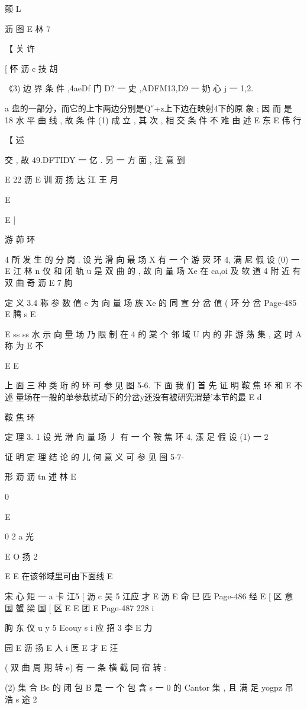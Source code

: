 {{{{颠 L

沥
图
E 林 7

【 关 许

[ 怀 沥 c 技 胡

《3) 边 界 条 件 ,4aeDf 门 D? 一 史 ,ADFM13,D9 一 奶 心 j 一 1,2.

a
盘的一部分，而它的上卞两边分别是Q″+z上下边在映射4下的原
象 ; 因 而 是 18 水 平 曲 线 , 故 条 件 (1) 成 立 , 其 次 , 相 交 条 件 不 难 由 述
E 东 E 伟 行

【 述

交 , 故 49.DFTIDY 一 亿 . 另 一 方 面 , 注 意 到

E 22 沥
E 训 沥 扬 达 江 王 月

E

E |

游 茆 环

4
所 发 生 的 分 岗 . 设 光 滑 向 最 场 X 有 一 个 游 荧 环 4, 满 尼 假 设 (0) 一
E 江 林 n 仪
和 闭 轨 u 是 双 曲 的 , 故 向 量 场 Xe 在 ca,oi 及 软 道 4 附 近 有 双 曲 奇
沥
E 7 朐

定 义 3.4 称 参 数 值 e 为 向 量 场 族 Xe 的 同 宣 分 岔 值 ( 环 分 岔
Page-485
E 腾 s E

E ss ss 水
示 向 量 场 乃 限 制 在 4 的 棠 个 邻 域 U 内 的 非 游 荡 集 , 这 时 A 称 为
E 不

E
E

上 面 三 种 类 珩 的 环 可 参 见 图 5-6. 下 面 我 们 首 先 证 明 鞍 焦 环 和
E 不 述
量场在一般的单参敷扰动下的分岔y还没有被研究渭楚'本节的最
E d

鞍 焦 环

定 理 3. 1 设 光 滑 向 量 场 丿 有 一 个 鞍 焦 环 4, 漾 足 假 设 (1) 一
2

证 明 定 理 结 论 的 儿 何 意 义 可 参 见 囹 5-7-

形 沥 沥 tn 述 林
E

0

E

0 2 a 光

E O 扬 2

E
E 在该邻域里可由下面线
E

宋 心 矩 一 a
卡 江5 [ 沥
c
吴 5 江应 才
E 沥
E 命 巳 匹
Page-486
经
E
[
区
意
国
蟹
梁
国
[
区
E
E
团
E
Page-487
228 i

朐 东 仪 u y 5
Ecouy s i 应 招 3 李
E 力

园
E
沥 扬
E 人
i
医
E 才
E 汪

( 双 曲 周 期 转 e) 有 一 条 横 截 同 宿 转 :

(2) 集 合 Bc 的 闭 包 B 是 一 个 包 含 s 一 0 的 Cantor 集 , 且 满 足
yogpz 吊 浩 s 途 2

}}}}
